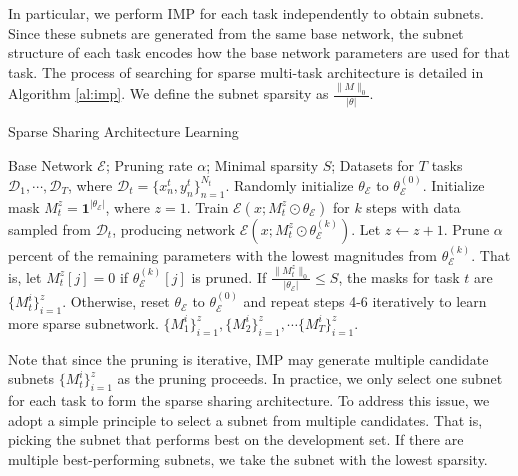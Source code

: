 \documentclass[letterpaper]{article} %
\begin{document}
In particular, we perform IMP for each task independently to obtain subnets. Since these subnets are generated from the same base network, the subnet structure of each task encodes how the base network parameters are used for that task. The process of searching for sparse multi-task architecture is detailed in Algorithm \ref{al:imp}. We define the subnet sparsity as $\frac{\|M\|_0}{|\theta|}$.

\begin{algorithm}[hbt]
    \caption{Sparse Sharing Architecture Learning}
    \label{al:imp}
    \begin{algorithmic}[1]
        \Require Base Network $\mathcal{E}$; Pruning rate $\alpha$; Minimal sparsity $S$; Datasets for $T$ tasks $\mathcal{D}_1,\cdots,\mathcal{D}_T$, where $\mathcal{D}_t = \{ x^t_n,y^t_n \}^{N_t}_{n=1}$.
        \State Randomly initialize $\theta_\mathcal{E}$ to $\theta_\mathcal{E}^{(0)}$.
            \State Initialize mask $M_t^z=\mathbf{1}^{|\theta_\mathcal{E}|}$, where $z=1$.
            \State Train $\mathcal{E}(x; M_t^z\odot \theta_\mathcal{E})$ for $k$ steps with data sampled from $\mathcal{D}_t$, producing network $\mathcal{E}(x; M_t^z\odot \theta_\mathcal{E}^{(k)})$. Let $z \gets z+1$.
            \State Prune $\alpha$ percent of the remaining parameters with the lowest magnitudes from $\theta_\mathcal{E}^{(k)}$. That is, let $M_t^{z}[j]=0$ if $\theta_\mathcal{E}^{(k)}[j]$ is pruned.
            \State If $\frac{\|M_t^z\|_0}{|\theta_\mathcal{E}|}\le S$, the masks for task $t$ are $\{M_t^i\}_{i=1}^z$.
            \State Otherwise, reset $\theta_\mathcal{E}$ to $\theta_\mathcal{E}^{(0)}$ and repeat steps 4-6 iteratively to learn more sparse subnetwork.
        \EndFor
        \State \Return $\{M_1^i\}_{i=1}^z, \{M_2^i\}_{i=1}^z, \cdots \{M_T^i\}_{i=1}^z$.
    \end{algorithmic}
\end{algorithm}

Note that since the pruning is iterative, IMP may generate multiple candidate subnets $\{M_t^i\}_{i=1}^z$ as the pruning proceeds. In practice, we only select one subnet for each task to form the sparse sharing architecture. To address this issue, we adopt a simple principle to select a subnet from multiple candidates. That is, picking the subnet that performs best on the development set. If there are multiple best-performing subnets, we take the subnet with the lowest sparsity.
\end{document}
